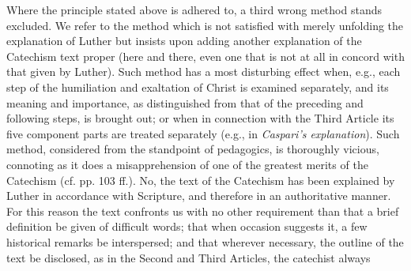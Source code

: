 Where the principle stated above is adhered to, a third wrong method stands excluded. We refer to the method which is not satisfied with merely unfolding the explanation of Luther but insists upon adding another explanation of the Catechism text proper (here and there, even one that is not at all in concord with that given by Luther). Such method has a most disturbing effect when, e.g., each step of the humiliation and exaltation of Christ is examined separately, and its meaning and importance, as distinguished from that of the preceding and following steps, is brought out; or when in connection with the Third Article its five component parts are treated separately (e.g., in \emph{Caspari’s explanation}). Such method, considered from the standpoint of pedagogics, is thoroughly vicious, connoting as it does a misapprehension of one of the greatest merits of the Catechism (cf. pp. 103 ff.). No, the text of the Catechism has been explained by Luther in accordance with Scripture, and therefore in an authoritative manner. For this reason the text confronts us with no other requirement than that a brief definition be given of difficult words; that when occasion suggests it, a few historical remarks be interspersed; and that wherever necessary, the outline of the text be disclosed, as in the Second and Third Articles, the catechist always
